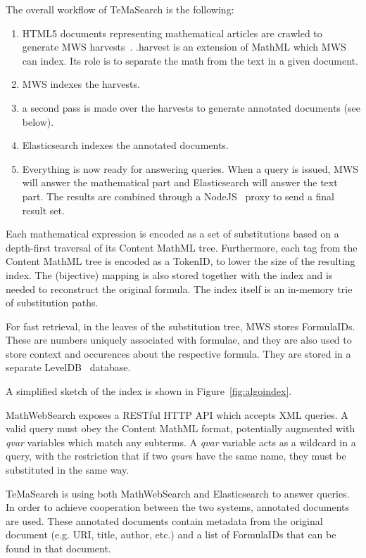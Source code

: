 \documentclass[a4paper,11pt,oneside]{article}
\def\MWS{\textsf{MWS}\xspace}
\def\mws{\textsf{MathWebSearch}\xspace}
\def\tms{\textsf{TeMaSearch}\xspace}
\def\els{\textsf{Elasticsearch}\xspace}
\def\cmml{\textsf{Content MathML}\xspace}
\def\xml{\textsf{XML}\xspace}
\def\mathml{\textsf{MathML}\xspace}
\begin{document}
The overall workflow of \tms is the following:
\begin{enumerate}
    \item HTML5 documents representing mathematical articles are
        crawled to generate \MWS harvests~\cite{mwsharvest:online}.
        \textsf{.harvest} is an extension of \mathml which \MWS can index. Its
        role is to separate the math from the text in a given document.
    \item \MWS indexes the harvests.
    \item a second pass is made over the harvests to generate annotated
        documents (see below).
    \item \els indexes the annotated documents.
    \item Everything is now ready for answering queries. When a query is
        issued, \MWS will answer the mathematical part and \els will answer the
        text part.  The results are combined through a
        NodeJS~\cite{nodejs:online} proxy to send a final result set.
\end{enumerate}

Each mathematical expression is encoded as a set of substitutions based
on a depth-first traversal of its \cmml tree.
Furthermore, each tag from the \cmml tree is encoded as a \textsf{TokenID},
to lower the size of the resulting index. The (bijective) mapping is also
stored together with the index and is needed to reconstruct the original
formula. The index itself is an in-memory trie of substitution paths.

For fast retrieval, in the leaves of the substitution tree, \MWS stores
\textsf{FormulaID}s. These are numbers uniquely associated with formulae,
and they are also used to store context and occurences about the respective
formula. They are stored in a separate LevelDB~\cite{leveldb:online} database.

A simplified sketch of the index is shown in Figure~\ref{fig:algoindex}.

\mws exposes a RESTful HTTP API which accepts \xml queries.
A valid query must obey the \cmml format, potentially augmented with
\emph{qvar} variables which match any subterms.  A \emph{qvar} variable acts as
a wildcard in a query, with the restriction that if two \emph{qvar}s have the
same name, they must be substituted in the same way.

\tms is using both \mws and \els to answer queries.
In order to achieve cooperation between the two systems, annotated documents
are used. These annotated documents contain metadata from the original document
(e.g. URI, title, author, etc.) and a list of \textsf{FormulaID}s that can be
found in that document.
\end{document}
